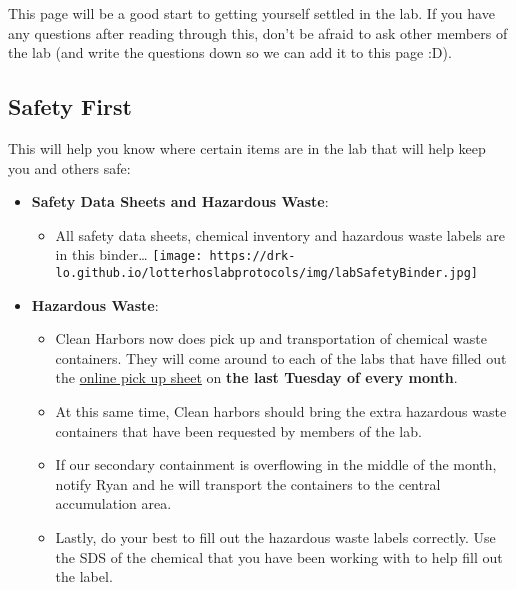 \documentclass[
  letterpaper,
  DIV=11,
  numbers=noendperiod]{scrreprt}
\providecommand{\tightlist}{%
  \setlength{\itemsep}{0pt}\setlength{\parskip}{0pt}}\usepackage{longtable,booktabs,array}
\begin{document}

This page will be a good start to getting yourself settled in the lab.
If you have any questions after reading through this, don't be afraid to
ask other members of the lab (and write the questions down so we can add
it to this page :D).

\hypertarget{safety-first}{%
\subsection*{\texorpdfstring{\textbf{Safety
First}}{Safety First}}\label{safety-first}}

This will help you know where certain items are in the lab that will
help keep you and others safe:

\begin{itemize}
\item
  \textbf{Safety Data Sheets and Hazardous Waste}:

  \begin{itemize}
  \tightlist
  \item
    All safety data sheets, chemical inventory and hazardous waste
    labels are in this binder\ldots{}
    \texttt{[image: https://drk-lo.github.io/lotterhoslabprotocols/img/labSafetyBinder.jpg]}
  \end{itemize}
\item
  \textbf{Hazardous Waste}:

  \begin{itemize}
  \item
    Clean Harbors now does pick up and transportation of chemical waste
    containers. They will come around to each of the labs that have
    filled out the \href{https://ehsa.nunet.neu.edu/neu_wp}{online pick
    up sheet} on \textbf{the last Tuesday of every month}.
  \item
    At this same time, Clean harbors should bring the extra hazardous
    waste containers that have been requested by members of the lab.
  \item
    If our secondary containment is overflowing in the middle of the
    month, notify Ryan and he will transport the containers to the
    central accumulation area.
  \item
    Lastly, do your best to fill out the hazardous waste labels
    correctly. Use the SDS of the chemical that you have been working
    with to help fill out the label.
  \end{itemize}
\end{itemize}
\end{document}
